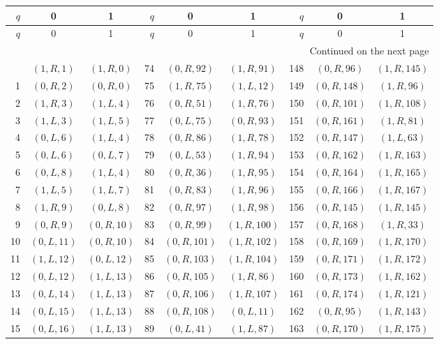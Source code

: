 {\small\setlength{\tabcolsep}{5pt}
\begin{longtable}{rcc@{\qquad}rcc@{\qquad}rcc}
\toprule
$q$ & 0 & 1 & $q$ & 0 & 1 & $q$ & 0 & 1\\
\midrule\endfirsthead
\toprule
$q$ & 0 & 1 & $q$ & 0 & 1 & $q$ & 0 & 1\\
\midrule\endhead
\midrule\multicolumn{9}{r}{Continued on the next page}\\\endfoot
\bottomrule\endlastfoot
0 & $(1,R,1)$ & $(1,R,0)$ & 74 & $(0,R,92)$ & $(1,R,91)$ & 148 & $(0,R,96)$ & $(1,R,145)$\\
1 & $(0,R,2)$ & $(0,R,0)$ & 75 & $(1,R,75)$ & $(1,L,12)$ & 149 & $(0,R,148)$ & $(1,R,96)$\\
2 & $(1,R,3)$ & $(1,L,4)$ & 76 & $(0,R,51)$ & $(1,R,76)$ & 150 & $(0,R,101)$ & $(1,R,108)$\\
3 & $(1,L,3)$ & $(1,L,5)$ & 77 & $(0,L,75)$ & $(0,R,93)$ & 151 & $(0,R,161)$ & $(1,R,81)$\\
4 & $(0,L,6)$ & $(1,L,4)$ & 78 & $(0,R,86)$ & $(1,R,78)$ & 152 & $(0,R,147)$ & $(1,L,63)$\\
5 & $(0,L,6)$ & $(0,L,7)$ & 79 & $(0,L,53)$ & $(1,R,94)$ & 153 & $(0,R,162)$ & $(1,R,163)$\\
6 & $(0,L,8)$ & $(1,L,4)$ & 80 & $(0,R,36)$ & $(1,R,95)$ & 154 & $(0,R,164)$ & $(1,R,165)$\\
7 & $(1,L,5)$ & $(1,L,7)$ & 81 & $(0,R,83)$ & $(1,R,96)$ & 155 & $(0,R,166)$ & $(1,R,167)$\\
8 & $(1,R,9)$ & $(0,L,8)$ & 82 & $(0,R,97)$ & $(1,R,98)$ & 156 & $(0,R,145)$ & $(1,R,145)$\\
9 & $(0,R,9)$ & $(0,R,10)$ & 83 & $(0,R,99)$ & $(1,R,100)$ & 157 & $(0,R,168)$ & $(1,R,33)$\\
10 & $(0,L,11)$ & $(0,R,10)$ & 84 & $(0,R,101)$ & $(1,R,102)$ & 158 & $(0,R,169)$ & $(1,R,170)$\\
11 & $(1,L,12)$ & $(0,L,12)$ & 85 & $(0,R,103)$ & $(1,R,104)$ & 159 & $(0,R,171)$ & $(1,R,172)$\\
12 & $(0,L,12)$ & $(1,L,13)$ & 86 & $(0,R,105)$ & $(1,R,86)$ & 160 & $(0,R,173)$ & $(1,R,162)$\\
13 & $(0,L,14)$ & $(1,L,13)$ & 87 & $(0,R,106)$ & $(1,R,107)$ & 161 & $(0,R,174)$ & $(1,R,121)$\\
14 & $(0,L,15)$ & $(1,L,13)$ & 88 & $(0,R,108)$ & $(0,L,11)$ & 162 & $(0,R,95)$ & $(1,R,143)$\\
15 & $(0,L,16)$ & $(1,L,13)$ & 89 & $(0,L,41)$ & $(1,L,87)$ & 163 & $(0,R,170)$ & $(1,R,175)$\\

\end{longtable}}
